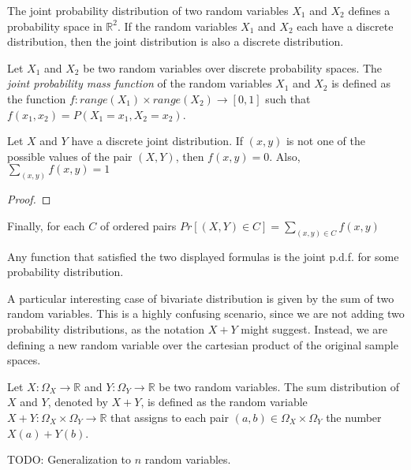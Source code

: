 The joint probability distribution of two random variables $X_1$ and $X_2$ defines a probability space in $\mathbb{R}^2$. If the random variables $X_1$ and $X_2$ each have a discrete distribution, then the joint distribution is also a discrete distribution.

\begin{definition}
Let $X_1$ and $X_2$ be two random variables over discrete probability spaces. The \emph{joint probability mass function} of the random variables $X_1$ and $X_2$ is defined as the function $f : range \left( X_1 \right) \times range \left( X_2 \right) \rightarrow [0, 1]$ such that $f \left( x_1, x_2 \right) = P \left( X_1 = x_1, X_2 = x_2 \right)$.
\end{definition}

\begin{proposition}
Let $X$ and $Y$ have a discrete joint distribution. If $\left(x,y\right)$ is not one of the possible values of the pair $\left(X,Y\right)$, then $f\left(x,y\right)=0$. Also, $\sum_{\left(x,y\right)}f\left(x,y\right)=1$
\end{proposition}
\begin{proof}
\end{proof}

Finally, for each $C$ of ordered pairs $Pr\left[\left(X,Y\right)\in C\right]=\sum_{\left(x,y\right)\in C}f\left(x,y\right)$

{\color{red} Any function that satisfied the two displayed formulas is the joint p.d.f. for some probability distribution.}

A particular interesting case of bivariate distribution is given by the sum of two random variables. This is a highly confusing scenario, since we are not adding two probability distributions, as the notation $X + Y$ might suggest. Instead, we are defining a new random variable over the cartesian product of the original sample spaces.

\begin{definition}
Let $X : \Omega_X \rightarrow \mathbb{R}$ and $Y : \Omega_Y \rightarrow \mathbb{R}$ be two random variables. The sum distribution of $X$ and $Y$, denoted by $X + Y$, is defined as the random variable $X + Y : \Omega_X \times \Omega_Y \rightarrow \mathbb{R}$ that assigns to each pair $\left( a, b \right) \in \Omega_X \times \Omega_Y$ the number $X(a) + Y(b)$.
\end{definition}

{\color{red} TODO: Generalization to $n$ random variables.}

